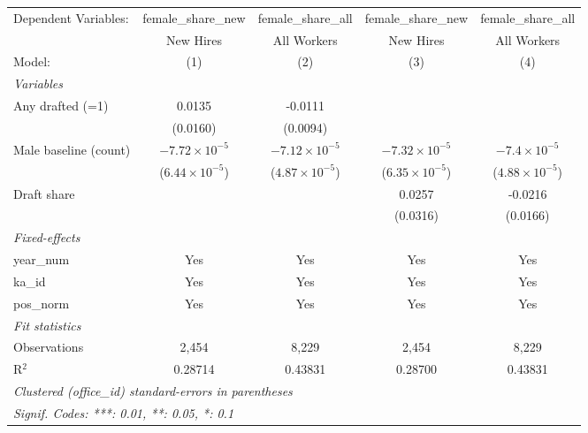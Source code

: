 \begingroup
\centering
\begin{tabular}{lcccc}
   \tabularnewline \midrule \midrule
   Dependent Variables:  & female\_share\_new      & female\_share\_all      & female\_share\_new      & female\_share\_all\\    
                         & New Hires               & All Workers             & New Hires               & All Workers \\   
   Model:                & (1)                     & (2)                     & (3)                     & (4)\\  
   \midrule
   \emph{Variables}\\
   Any drafted (=1)      & 0.0135                  & -0.0111                 &                         &   \\   
                         & (0.0160)                & (0.0094)                &                         &   \\   
   Male baseline (count) & $-7.72\times 10^{-5}$   & $-7.12\times 10^{-5}$   & $-7.32\times 10^{-5}$   & $-7.4\times 10^{-5}$\\    
                         & ($6.44\times 10^{-5}$)  & ($4.87\times 10^{-5}$)  & ($6.35\times 10^{-5}$)  & ($4.88\times 10^{-5}$)\\    
   Draft share           &                         &                         & 0.0257                  & -0.0216\\   
                         &                         &                         & (0.0316)                & (0.0166)\\   
   \midrule
   \emph{Fixed-effects}\\
   year\_num             & Yes                     & Yes                     & Yes                     & Yes\\  
   ka\_id                & Yes                     & Yes                     & Yes                     & Yes\\  
   pos\_norm             & Yes                     & Yes                     & Yes                     & Yes\\  
   \midrule
   \emph{Fit statistics}\\
   Observations          & 2,454                   & 8,229                   & 2,454                   & 8,229\\  
   R$^2$                 & 0.28714                 & 0.43831                 & 0.28700                 & 0.43831\\  
   \midrule \midrule
   \multicolumn{5}{l}{\emph{Clustered (office\_id) standard-errors in parentheses}}\\
   \multicolumn{5}{l}{\emph{Signif. Codes: ***: 0.01, **: 0.05, *: 0.1}}\\
\end{tabular}
\par\endgroup

